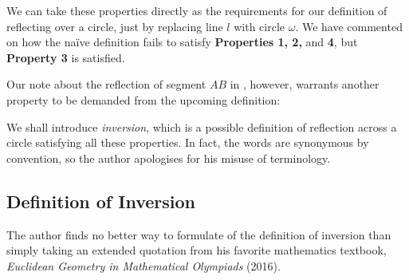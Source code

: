 \documentclass[a4paper, 12pt]{article}
\theoremstyle{definition}
\begin{document}
We can take these properties directly as the requirements for our definition of reflecting over a circle,
just by replacing line $l$ with circle $\omega$.
We have commented on how the naïve definition fails to satisfy \textbf{Properties 1, 2,} and \textbf{4},
but \textbf{Property 3} is satisfied.

Our note about the reflection of segment $AB$ in , however, warrants another property to be demanded
from the upcoming definition:

\vspace{-1em}

We shall introduce \textit{inversion}, which is a possible definition of reflection across a circle satisfying all these properties.
In fact, the words are synonymous by convention, so the author apologises for his misuse of terminology.

\subsection{Definition of Inversion}

The author finds no better way to formulate of the definition of inversion than simply taking an 
extended quotation from his favorite mathematics textbook, \textit{Euclidean Geometry in Mathematical Olympiads} (2016).
\end{document}
